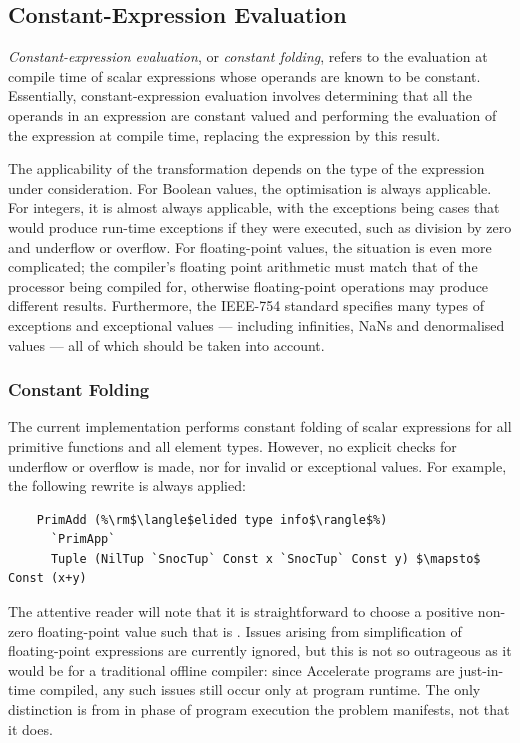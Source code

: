 \subsection{Constant-Expression Evaluation}

\emph{Constant-expression evaluation}, or \emph{constant folding}, refers to the
evaluation at compile time of scalar expressions whose operands are known to be
constant. Essentially, constant-expression evaluation involves determining that
all the operands in an expression are constant valued and performing the
evaluation of the expression at compile time, replacing the expression by this
result.

The applicability of the transformation depends on the type of the expression
under consideration. For Boolean values, the optimisation is always applicable.
For integers, it is almost always applicable, with the exceptions being cases
that would produce run-time exceptions if they were executed, such as division
by zero and underflow or overflow. For floating-point values, the situation is
even more complicated; the compiler's floating point arithmetic must match that
of the processor being compiled for, otherwise floating-point operations may
produce different results. Furthermore, the IEEE-754 standard specifies many
types of exceptions and exceptional values --- including infinities, NaNs and
denormalised values --- all of which should be taken into account.


\subsubsection{Constant Folding}

The current implementation performs constant folding of scalar expressions for
all primitive functions and all element types. However, no explicit checks for
underflow or overflow is made, nor for invalid or exceptional values. For
example, the following rewrite is always applied:
%
%
\begin{lstlisting}[style=Haskell,numbers=none,mathescape]
%\bf$\langle$ constant folding $\rangle$%
    PrimAdd (%\rm$\langle$elided type info$\rangle$%)
      `PrimApp`
      Tuple (NilTup `SnocTup` Const x `SnocTup` Const y) $\mapsto$ Const (x+y)
\end{lstlisting}
%
The attentive reader will note that it is straightforward to choose a positive
non-zero floating-point value  such that  is
. Issues arising from simplification of floating-point expressions
are currently ignored, but this is not so outrageous as it would be for a
traditional offline compiler: since Accelerate programs are just-in-time
compiled, any such issues still occur only at program runtime. The only
distinction is from in phase of program execution the problem manifests, not
that it does.

